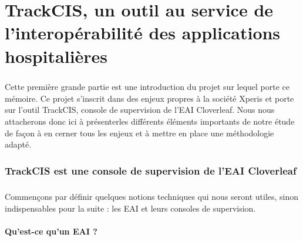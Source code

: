 \chapter{TrackCIS, un outil au service de l'interopérabilité des applications
hospitalières}
	\paragraph{}
	Cette première grande partie est une introduction du projet sur lequel porte ce
	mémoire. Ce projet s'inscrit dans des enjeux propres à la société Xperis et
	porte sur l'outil TrackCIS, console de supervision de l'EAI Cloverleaf. Nous
	nous attacherons donc ici à présenterles différents éléments importants de
	notre étude de façon à en cerner tous les enjeux et à mettre en place une
	méthodologie adapté.

	\subsection{TrackCIS est une console de supervision de l'EAI Cloverleaf}
		\paragraph{}
		Commençons par définir quelques notions techniques qui nous seront utiles,
		sinon indispensables pour la suite : les EAI et leurs consoles de supervision.
		
		\subsubsection{Qu'est-ce qu'un EAI ?}
